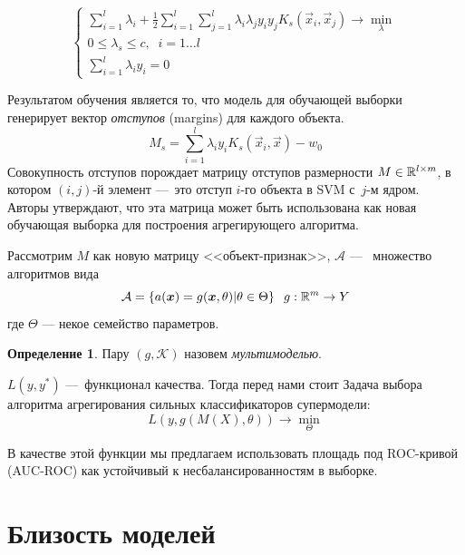\documentclass[12pt,twoside]{article}
\theoremstyle{plain}
\theoremstyle{remark}
\theoremstyle{definition}
\newtheorem{df}{Определение}[section]
\begin{document}
\begin{equation*}
 \begin{cases}
   \sum_{i=1}^l \lambda_i + \frac{1}{2}\sum_{i=1}^{l}\sum_{j=1}^{l}
    \lambda_i \lambda_j y_i y_j K_s(\vec{x}_i, \vec{x}_j) \to \min_\lambda
   \\
   0 \leq \lambda_s \leq c, \;\; i = 1\ldots l
   \\
   \sum_{i=1}^l\lambda_i y_i = 0
 \end{cases}
\end{equation*}

Результатом обучения является то, что модель для обучающей выборки генерирует вектор \emph{отступов} (margins) для каждого объекта. 
$$
M_s = \sum_{i=1}^l\lambda_i y_i K_s(\vec{x}_i, \vec{x}) - w_0
$$
Совокупность отступов порождает матрицу отступов  размерности
$M \in \R^{l\times m}$,
в котором $(i, j)$-й элемент ---~это отступ $i$-го объекта в SVM с~$j$-м ядром. Авторы утверждают, что эта матрица может быть использована как новая обучающая выборка для построения агрегирующего алгоритма.

Рассмотрим $M$ как новую матрицу <<объект-признак>>, $\mathcal{A}$ ---~ множество алгоритмов
вида
\begin{equation}
    \mathcal{A} = \left\{a(\boldsymbol{x}) = g(\boldsymbol{x}, \theta)|\theta \in \Theta\right\}\;\; g:\mathbb{R}^m \to Y
\end{equation}
где $\Theta$ --- некое семейство параметров.
\begin{df}
Пару $(g, \mathcal{K})$ назовем \emph{мультимоделью}.
\end{df}

$L(y, y^*)$ ---~функционал качества. Тогда перед нами стоит 
Задача выбора алгоритма агрегирования сильных классификаторов супермодели:
	\begin{equation}
    	L(y, g(M(X), \theta)) \to \min_{\Theta}
	\end{equation}

В качестве этой функции мы предлагаем использовать площадь под ROC-кривой (AUC-ROC) как устойчивый к несбалансированностям в выборке.
\section{Близость моделей}
\end{document}
